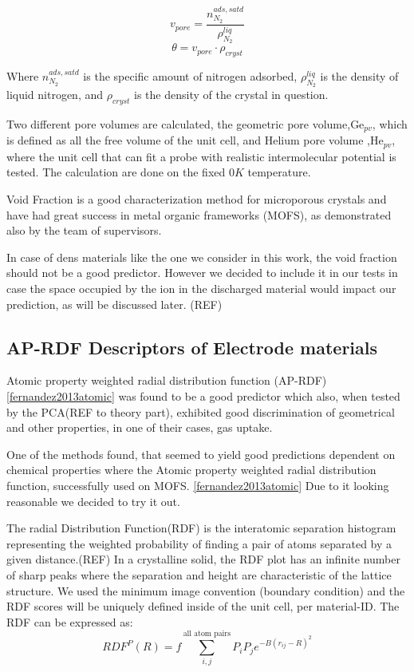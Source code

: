 \begin{equation}
v_{pore} = \frac{n^{ads,satd}_{N_2}}{\rho^{liq}_{N_2}}
\end{equation}
\begin{equation}
\theta = v_{pore} \cdot \rho_{cryst}
\end{equation} 

	Where $n^{ads,satd}_{N_2}$ is the specific amount of nitrogen adsorbed, $\rho^{liq}_{N_2}$ is the density of liquid nitrogen, and $\rho_{cryst}$ is the density of the crystal in question. 
	
	Two different pore volumes are calculated, the geometric pore volume,$\text{Ge}_{pv}$, which is defined as all the free volume of the unit cell, and Helium pore volume ,$\text{He}_{pv}$, where the unit cell that can fit a probe with realistic intermolecular potential is tested. The calculation are done on the fixed $0 \si{K}$ temperature. 

	Void Fraction is a good characterization method for microporous crystals and have had great success in metal organic frameworks (MOFS), as demonstrated also by the team of supervisors.
	
	In case of dens materials like the one we consider in this work, the void fraction should not be a good predictor. However we decided to include it in our tests in case the space occupied by the ion in the discharged material would impact our prediction, as will be discussed later. (REF)

\subsection{AP-RDF Descriptors of Electrode materials}

	Atomic property weighted radial distribution function (AP-RDF)\ref{fernandez2013atomic} was found to be a good predictor which also, when tested by the PCA(REF to theory part), exhibited good discrimination of geometrical and other properties, in one of their cases, gas uptake.
	
	One of the methods found, that seemed to yield good predictions dependent on chemical properties where the Atomic property weighted radial distribution function, successfully used on MOFS. \ref{fernandez2013atomic} Due to it looking reasonable we decided to try it out.

	The radial Distribution Function(RDF) is the interatomic separation histogram representing the weighted probability of finding a pair of atoms separated by a given distance.(REF) In a crystalline solid, the RDF plot has an infinite number of sharp peaks where the separation and height are characteristic of the lattice structure. We used the minimum image convention (boundary condition) and the RDF scores will be uniquely defined inside of the unit cell, per material-ID. The RDF can be expressed as:
\begin{equation}\label{eq:RDF}
RDF^P(R) = f \sum^{\text{all atom pairs}}_{i,j} P_i P_j e^{-B(r_{ij} - R)^2}
\end{equation}

